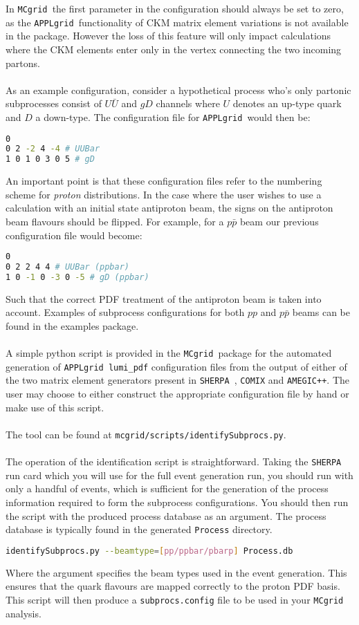 \documentclass[11pt]{article}
\newcommand{\mcgrid} {{\tt MCgrid }}
\newcommand{\appl} {{\tt APPLgrid }}
\newcommand{\sherpa} {{\tt SHERPA }}
\begin{document}
In \mcgrid the first parameter in the configuration should always be set to zero, as the \appl functionality of CKM matrix element variations is not available in the package. However the loss of this feature will only impact calculations where the CKM elements enter only in the vertex connecting the two incoming partons.  \\\\
As an example configuration, consider a hypothetical process who's only partonic subprocesses consist of $U\bar{U}$ and $gD$ channels where $U$ denotes an up-type quark and $D$ a down-type. The configuration file for \appl would then be:
\begin{lstlisting}[language=bash]
0 
0 2 -2 4 -4 # UUBar
1 0 1 0 3 0 5 # gD
\end{lstlisting}
An important point is that these configuration files refer to the numbering scheme for \emph{proton} distributions. In the case where the user wishes to use a calculation with an initial state antiproton beam, the signs on the antiproton beam flavours should be flipped. For example, for a $p\bar{p}$ beam our previous configuration file would become:
\begin{lstlisting}[language=bash]
0
0 2 2 4 4 # UUBar (ppbar)
1 0 -1 0 -3 0 -5 # gD (ppbar)
\end{lstlisting}
Such that the correct PDF treatment of the antiproton beam is taken into account. Examples of subprocess configurations for both $pp$ and $p\bar{p}$ beams can be found in the examples package.\\\\
A simple python script is provided in the \mcgrid package for the automated generation of \appl \lstinline[language=c++]{lumi_pdf} configuration files from the output of either of the two matrix element generators present in \sherpa, {\tt COMIX}\cite{Gleisberg:2008fv} and {\tt AMEGIC++}\cite{Krauss:2001iv}. The user may choose to either construct the appropriate configuration file by hand or make use of this script.\\\\
The tool can be found at \lstinline[language=bash]{mcgrid/scripts/identifySubprocs.py}. 
\\\\
The operation of the identification script is straightforward. Taking the \sherpa run card which you will use for the full event generation run, you should run with only a handful of events, which is sufficient for the generation of the process information required to form the subprocess configurations. You should then run the script with the produced process database as an argument. The process database is typically found in the generated \lstinline[language=bash]{Process} directory.

\begin{lstlisting}[language=bash]
identifySubprocs.py --beamtype=[pp/ppbar/pbarp] Process.db
\end{lstlisting}

Where the argument specifies the beam types used in the event generation. This ensures that the quark flavours are mapped correctly to the proton PDF basis. This script will then produce a \lstinline[language=bash]{subprocs.config} file to be used in your \mcgrid analysis.  
\label{sec:subproc}
\end{document}
